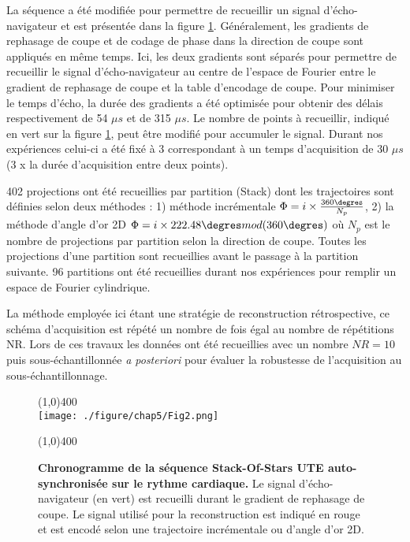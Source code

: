 La séquence a été modifiée pour permettre de recueillir un signal d'écho-navigateur et est présentée dans la figure \ref{fig:SeqSoSUTE}. Généralement, les gradients de rephasage de coupe et de codage de phase dans la direction de coupe sont appliqués en même temps. Ici, les deux gradients sont séparés pour permettre de recueillir le signal d'écho-navigateur au centre de l'espace de Fourier entre le gradient de rephasage de coupe et la table d'encodage de coupe. 
Pour minimiser le temps d'écho, la durée des gradients a été optimisée pour obtenir des délais respectivement de 54 $\mu s$ et de 315 $\mu s$.  Le nombre de points à recueillir, indiqué en vert sur la figure \ref{fig:SeqSoSUTE}, peut être modifié pour accumuler le signal. Durant nos expériences celui-ci a été fixé à 3 correspondant à un temps d'acquisition de 30 $\mu s$ (3 x la durée d'acquisition entre deux points).

402 projections ont été recueillies par partition (Stack) dont les trajectoires sont définies selon deux méthodes : 1) méthode incrémentale $\Phi = i \times \frac{360\degres}{N_p}$, 2) la méthode d'angle d'or 2D $\Phi = i \times 222.48\degres mod(360\degres)$ où $N_p$ est le nombre de projections par partition selon la direction de coupe. Toutes les projections d'une partition sont recueillies avant le passage à la partition suivante. 96 partitions ont été recueillies durant nos expériences pour remplir un espace de Fourier cylindrique.

La méthode employée ici étant une stratégie de reconstruction rétrospective, ce schéma d'acquisition est répété un nombre de fois égal au nombre de répétitions NR. Lors de ces travaux les données ont été recueillies avec un nombre ${NR}=10$ puis sous-échantillonnée \textit{a posteriori} pour évaluer la robustesse de l'acquisition au sous-échantillonnage.

\begin{figure}[H]
\centering
\line(1,0){400} \\
\texttt{[image: ./figure/chap5/Fig2.png]}
\caption[Chronogramme de la séquence Stack-Of-Stars UTE auto-synchronisée sur le rythme cardiaque.]{\label{fig:SeqSoSUTE}\textbf{Chronogramme de la séquence Stack-Of-Stars UTE auto-synchronisée sur le rythme cardiaque.} Le signal d'écho-navigateur (en vert) est recueilli durant le gradient de rephasage de coupe. Le signal utilisé pour la reconstruction est indiqué en rouge et est encodé selon une trajectoire incrémentale ou d'angle d'or 2D.}
\line(1,0){400} \\ 
\end{figure}

